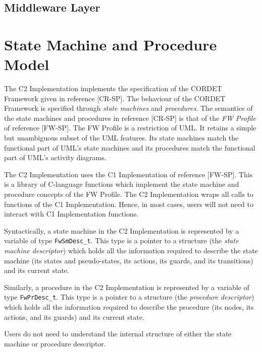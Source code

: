 \documentclass{pnp_article}
\begin{document}
\subsection{Middleware Layer}\label{sec:MwLayer} 


\section{State Machine and Procedure Model}\label{sec:SmAndPrModel}
The C2 Implementation implements the specification of the CORDET Framework given in reference [CR-SP]. The behaviour of the CORDET Framework is specified through \textit{state machines} and \textit{procedures}. The semantics of the state machines and procedures in reference [CR-SP] is that of the \textit{FW Profile} of reference [FW-SP]. The FW Profile is a restriction of UML. It retains a simple but unambiguous subset of the UML features. Its state machines match the functional part of UML's state machines and its procedures match the functional part of UML's activity diagrams. 

The C2 Implementation uses the C1 Implementation of reference [FW-SP]. This is a library of C-language functions which implement the state machine and procedure concepts of the FW Profile. The C2 Implementation wraps all calls to functions of the C1 Implementation. Hence, in most cases, users will not need to interact with C1 Implementation functions.

Syntactically, a state machine in the C2 Implementation is represented by a variable of type \texttt{FwSmDesc\_t}. This type is a pointer to a structure (the \textit{state machine descriptor}) which holds all the information required to describe the state machine (its states and pseudo-states, its actions, its guards, and its transitions) and its current state. 

Similarly, a procedure in the C2 Implementation is represented by a variable of type \texttt{FwPrDesc\_t}. This type is a pointer to a structure (the \textit{procedure descriptor}) which holds all the information required to describe the procedure (its nodes, its actions, and its guards) and its current state. 

Users do not need to understand the internal structure of either the state machine or procedure descriptor.
\end{document}
